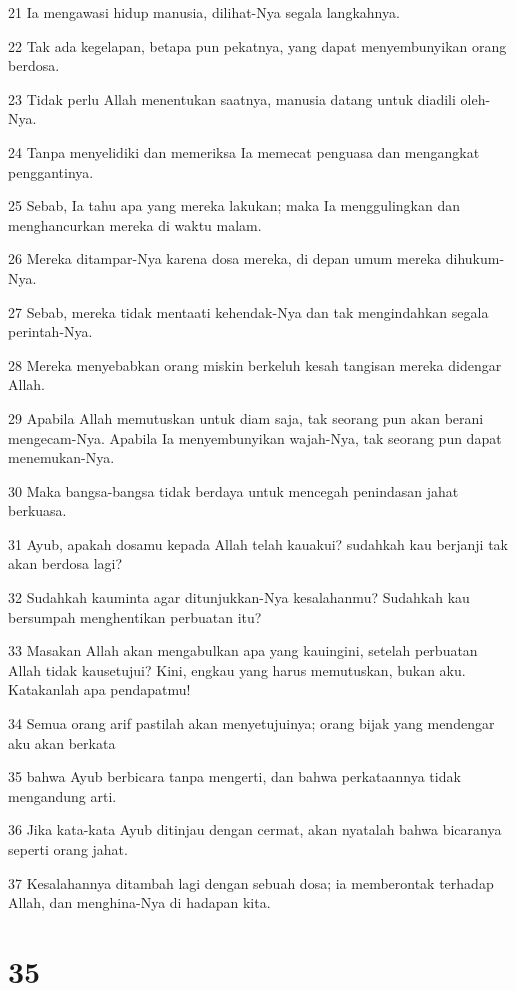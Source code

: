 \par 21 Ia mengawasi hidup manusia, dilihat-Nya segala langkahnya.
\par 22 Tak ada kegelapan, betapa pun pekatnya, yang dapat menyembunyikan orang berdosa.
\par 23 Tidak perlu Allah menentukan saatnya, manusia datang untuk diadili oleh-Nya.
\par 24 Tanpa menyelidiki dan memeriksa Ia memecat penguasa dan mengangkat penggantinya.
\par 25 Sebab, Ia tahu apa yang mereka lakukan; maka Ia menggulingkan dan menghancurkan mereka di waktu malam.
\par 26 Mereka ditampar-Nya karena dosa mereka, di depan umum mereka dihukum-Nya.
\par 27 Sebab, mereka tidak mentaati kehendak-Nya dan tak mengindahkan segala perintah-Nya.
\par 28 Mereka menyebabkan orang miskin berkeluh kesah tangisan mereka didengar Allah.
\par 29 Apabila Allah memutuskan untuk diam saja, tak seorang pun akan berani mengecam-Nya. Apabila Ia menyembunyikan wajah-Nya, tak seorang pun dapat menemukan-Nya.
\par 30 Maka bangsa-bangsa tidak berdaya untuk mencegah penindasan jahat berkuasa.
\par 31 Ayub, apakah dosamu kepada Allah telah kauakui? sudahkah kau berjanji tak akan berdosa lagi?
\par 32 Sudahkah kauminta agar ditunjukkan-Nya kesalahanmu? Sudahkah kau bersumpah menghentikan perbuatan itu?
\par 33 Masakan Allah akan mengabulkan apa yang kauingini, setelah perbuatan Allah tidak kausetujui? Kini, engkau yang harus memutuskan, bukan aku. Katakanlah apa pendapatmu!
\par 34 Semua orang arif pastilah akan menyetujuinya; orang bijak yang mendengar aku akan berkata
\par 35 bahwa Ayub berbicara tanpa mengerti, dan bahwa perkataannya tidak mengandung arti.
\par 36 Jika kata-kata Ayub ditinjau dengan cermat, akan nyatalah bahwa bicaranya seperti orang jahat.
\par 37 Kesalahannya ditambah lagi dengan sebuah dosa; ia memberontak terhadap Allah, dan menghina-Nya di hadapan kita.

\chapter{35}

